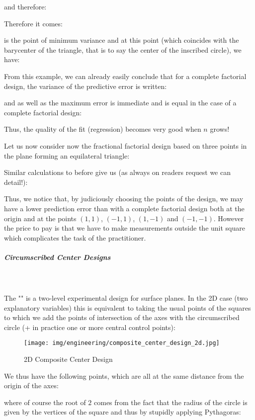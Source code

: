 	and therefore:
	
	Therefore it comes:
	
	is the point of minimum variance and at this point (which coincides with the barycenter of the triangle, that is to say the center of the inscribed circle), we have:
	
 	From this example, we can already easily conclude that for a complete factorial design, the variance of the predictive error is written:
	
 	and as well as the maximum error is immediate and is equal in the case of a complete factorial design:
	
 	Thus, the quality of the fit (regression) becomes very good when $n$ grows!

	Let us now consider now the fractional factorial design based on three points in the plane forming an equilateral triangle:
	
	Similar calculations to before give us (as always on readers request we can detail!):
	
	Thus, we notice that, by judiciously choosing the points of the design, we may have a lower prediction error than with a complete factorial design both at the origin and at the points $(1, 1)$, $(-1,1)$, $(1, -1)$ and $(-1, -1)$. However the price to pay is that we have to make measurements outside the unit square which complicates the task of the practitioner.
	
	
	
	\subparagraph{Circumscribed Center Designs}\mbox{}\\\\
	The "" is a two-level experimental design for surface planes. In the 2D case (two explanatory variables) this is equivalent to taking the usual points of the squares to which we add the points of intersection of the axes with the circumscribed circle (+ in practice one or more central control points):	
	\begin{figure}[H]
		\centering
		\texttt{[image: img/engineering/composite\_center\_design\_2d.jpg]}	
		\caption{2D Composite Center Design}
	\end{figure}
	We thus have the following points, which are all at the same distance from the origin of the axes:
	
	where of course the root of $2$ comes from the fact that the radius of the circle is given by the vertices of the square and thus by stupidly applying Pythagoras:
	
